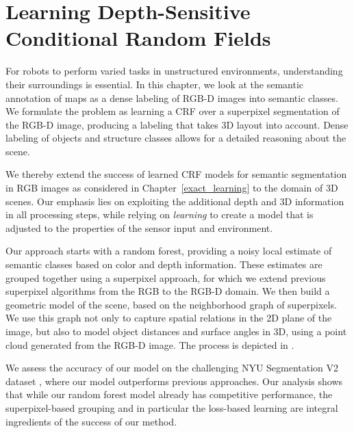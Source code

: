 
\chapter{Learning Depth-Sensitive Conditional Random Fields}\label{ch:nyu}

For robots to perform varied tasks in unstructured environments, understanding their
surroundings is essential. In this chapter, we look at the semantic annotation of maps
as a dense labeling of \mbox{RGB-D} images into semantic classes. We formulate the problem
as learning a CRF over a superpixel segmentation of the \mbox{RGB-D} image, producing a labeling
that takes 3D layout into account. Dense labeling of objects
and structure classes allows for a detailed reasoning about the scene.


We thereby extend the success of learned CRF models for semantic segmentation
in RGB images as considered in Chapter~\ref{exact_learning} to the domain of 3D scenes.
Our emphasis lies on exploiting the additional depth and 3D information in all
processing steps, while relying on \emph{learning} to create a model that 
is adjusted to the properties of the sensor input and environment.

Our approach starts with a random forest, providing a noisy local estimate
of semantic classes based on color and depth information. These estimates
are grouped together using a superpixel approach, for which we extend previous
superpixel algorithms from the RGB to the \mbox{RGB-D} domain.
We then build a geometric model of the scene, based on the neighborhood graph
of superpixels.  We use this graph not only to capture spatial relations in the
2D plane of the image, but also to model object distances and surface angles in
3D, using a point cloud generated from the \mbox{RGB-D} image. The process is depicted
in .

We assess the accuracy of our model on the challenging NYU Segmentation V2
dataset \citep{SilbermanECCV12}, where our model outperforms previous
approaches.  Our analysis shows that while our random forest model
already has competitive performance, the superpixel-based grouping and in
particular the loss-based learning are integral ingredients of the success of our method.

